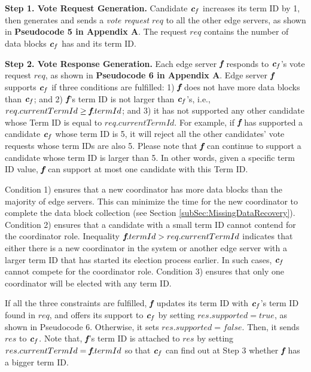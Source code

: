\documentclass[10pt,journal,compsoc]{IEEEtran}
\def\mathbi#1{\textbf{\em #1}}
\begin{document}
\smallskip
\textbf{Step 1. Vote Request Generation.} Candidate $\mathbi{c}_f$ increases its term ID by 1, then generates and sends a \textit{vote request} $req$ to all the other edge servers, as shown in \textbf{Pseudocode 5 in Appendix A}. The request $req$ contains the number of data blocks $\mathbi{c}_f$ has and its term ID.

\smallskip
\textbf{Step 2. Vote Response Generation.} Each edge server $\mathbi{f}$ responds to $\mathbi{c}_f$'s vote request $req$, as shown in \textbf{Pseudocode 6 in Appendix A}. Edge server $\mathbi{f}$ supports $\mathbi{c}_f$ if three conditions are fulfilled: 1) $\mathbi{f}$ does not have more data blocks than $\mathbi{c}_f$; and 2) $\mathbi{f}$'s term ID is not larger than $\mathbi{c}_f$'s, i.e., $req.currentTermId \geq \mathbi{f}.termId$; and 3) it has not supported any other candidate whose Term ID is equal to $req.currentTermId$. For example, if $\mathbi{f}$ has supported a candidate $\mathbi{c}_f$ whose term ID is 5, it will reject all the other candidates' vote requests whose term IDs are also 5. Please note that $\mathbi{f}$ can continue to support a candidate whose term ID is larger than 5. In other words, given a specific term ID value, $\mathbi{f}$ can support at most one candidate with this Term ID. 

Condition 1) ensures that a new coordinator has more data blocks than the majority of edge servers. This can minimize the time for the new coordinator to complete the data block collection (see Section \ref{subSec:MissingDataRecovery}). Condition 2) ensures that a candidate with a small term ID cannot contend for the coordinator role. Inequality $\mathbi{f}.termId>req.currentTermId$ indicates that either there is a new coordinator in the system or another edge server with a larger term ID that has started its election process earlier. In such cases, $\mathbi{c}_f$ cannot compete for the coordinator role. Condition 3) ensures that only one coordinator will be elected with any term ID. 

If all the three constraints are fulfilled, $\mathbi{f}$ updates its term ID with $\mathbi{c}_f$'s term ID found in $req$, and offers its support to $\mathbi{c}_f$ by setting $res.supported=true$, as shown in Pseudocode 6. Otherwise, it sets $res.supported=false$. Then, it sends $res$ to $\mathbi{c}_f$. Note that, $\mathbi{f}$'s term ID is attached to $res$ by setting $res.currentTermId = \mathbi{f}.termId$ so that $\mathbi{c}_f$ can find out at Step 3 whether $\mathbi{f}$ has a bigger term ID. 
\end{document}
